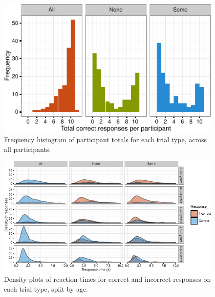 \documentclass[10pt, letterpaper]{article}
\newenvironment{CodeChunk}{}{}
\begin{document}
\begin{CodeChunk}
\begin{figure}[t]
\includegraphics{figs/diptest-1} \caption[Frequency histogram of participant totals for each trial type, across all participants]{Frequency histogram of participant totals for each trial type, across all participants.}\label{fig:diptest}
\end{figure}
\end{CodeChunk}

\begin{CodeChunk}
\begin{figure}[t]

{\centering \includegraphics{figs/dense-1} 

}

\caption[Density plots of reaction times for correct and incorrect responses on each trial type, split by age]{Density plots of reaction times for correct and incorrect responses on each trial type, split by age.}\label{fig:dense}
\end{figure}
\end{CodeChunk}
\end{document}
